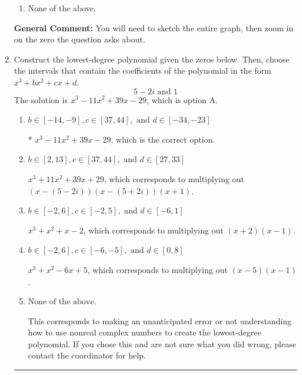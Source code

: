 \documentclass{extbook}[14pt]
\newcommand{\litem}[1]{\item #1

\rule{\textwidth}{0.4pt}}
\begin{document}
\begin{enumerate}
{\begin{enumerate}[label=\Alph*.]
\item None of the above.\end{enumerate}
\textbf{General Comment:} You will need to sketch the entire graph, then zoom in on the zero the question asks about.
}
\litem{
Construct the lowest-degree polynomial given the zeros below. Then, choose the intervals that contain the coefficients of the polynomial in the form $x^3+bx^2+cx+d$.
\[ 5 - 2 i \text{ and } 1 \]The solution is \( x^{3} -11 x^{2} +39 x -29 \), which is option A.\begin{enumerate}[label=\Alph*.]
\item \( b \in [-14, -9], c \in [37, 44], \text{ and } d \in [-34, -23] \)

* $x^{3} -11 x^{2} +39 x -29$, which is the correct option.
\item \( b \in [2, 13], c \in [37, 44], \text{ and } d \in [27, 33] \)

$x^{3} +11 x^{2} +39 x + 29$, which corresponds to multiplying out $(x-(5 - 2 i))(x-(5 + 2 i))(x + 1)$.
\item \( b \in [-2, 6], c \in [-2, 5], \text{ and } d \in [-6, 1] \)

$x^{3} + x^{2} +x -2$, which corresponds to multiplying out $(x + 2)(x -1)$.
\item \( b \in [-2, 6], c \in [-6, -5], \text{ and } d \in [0, 8] \)

$x^{3} + x^{2} -6 x + 5$, which corresponds to multiplying out $(x -5)(x -1)$.
\item \( \text{None of the above.} \)

This corresponds to making an unanticipated error or not understanding how to use nonreal complex numbers to create the lowest-degree polynomial. If you chose this and are not sure what you did wrong, please contact the coordinator for help.
\end{enumerate}

}
\end{enumerate}
\end{document}
